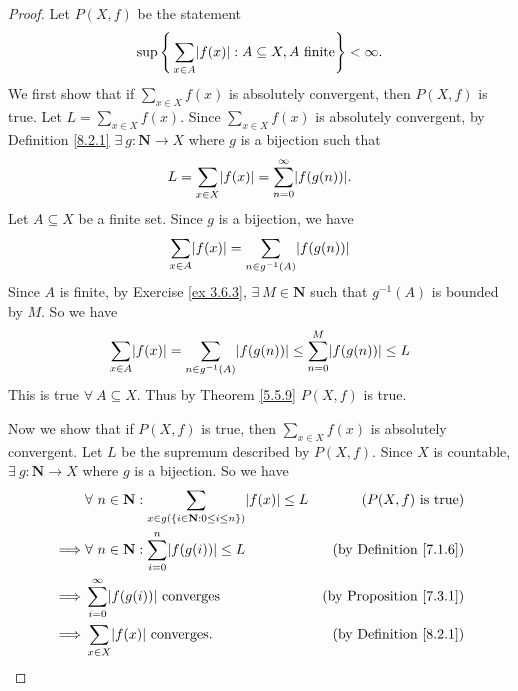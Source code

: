 \begin{proof}
Let \(P(X, f)\) be the statement
\[
    \sup\Bigg\{\sum_{x \in A} \abs*{f(x)} : A \subseteq X, A \text{ finite}\Bigg\} < \infty.
\]
We first show that if \(\sum_{x \in X} f(x)\) is absolutely convergent, then \(P(X, f)\) is true.
Let \(L = \sum_{x \in X} f(x)\).
Since \(\sum_{x \in X} f(x)\) is absolutely convergent, by Definition \ref{8.2.1} \(\exists\ g : \mathbf{N} \to X\) where \(g\) is a bijection such that
\[
    L = \sum_{x \in X} \abs*{f(x)} = \sum_{n = 0}^\infty \abs*{f(g(n))}.
\]
Let \(A \subseteq X\) be a finite set.
Since \(g\) is a bijection, we have
\[
    \sum_{x \in A} \abs*{f(x)} = \sum_{n \in g^{-1}(A)} \abs*{f(g(n))}
\]
Since \(A\) is finite, by Exercise \ref{ex 3.6.3}, \(\exists\ M \in \mathbf{N}\) such that \(g^{-1}(A)\) is bounded by \(M\).
So we have
\[
    \sum_{x \in A} \abs*{f(x)} = \sum_{n \in g^{-1}(A)} \abs*{f(g(n))} \leq \sum_{n = 0}^M \abs*{f(g(n))} \leq L
\]
This is true \(\forall\ A \subseteq X\).
Thus by Theorem \ref{5.5.9} \(P(X, f)\) is true.

Now we show that if \(P(X, f)\) is true, then \(\sum_{x \in X} f(x)\) is absolutely convergent.
Let \(L\) be the supremum described by \(P(X, f)\).
Since \(X\) is countable, \(\exists\ g : \mathbf{N} \to X\) where \(g\) is a bijection.
So we have
\begin{align*}
& \forall\ n \in \mathbf{N} : \sum_{x \in g(\{i \in \mathbf{N} : 0 \leq i \leq n\})} \abs*{f(x)} \leq L & (P(X, f) \text{ is true}) \\
\implies & \forall\ n \in \mathbf{N} : \sum_{i = 0}^n \abs*{f(g(i))} \leq L & \text{(by Definition \ref{7.1.6})} \\
\implies & \sum_{i = 0}^\infty \abs*{f(g(i))} \text{ converges} & \text{(by Proposition \ref{7.3.1})} \\
\implies & \sum_{x \in X} \abs*{f(x)} \text{ converges}. & \text{(by Definition \ref{8.2.1})}
\end{align*}
\end{proof}